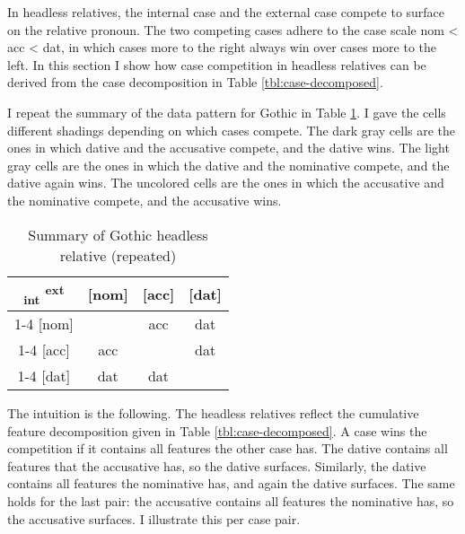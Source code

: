 In headless relatives, the internal case and the external case compete to surface on the relative pronoun. The two competing cases adhere to the case scale \ac{nom} < \ac{acc} < \ac{dat}, in which cases more to the right always win over cases more to the left. In this section I show how case competition in headless relatives can be derived from the case decomposition in Table \ref{tbl:case-decomposed}.

I repeat the summary of the data pattern for Gothic in Table \ref{tbl:summary-gothic-deriving}. I gave the cells different shadings depending on which cases compete. The dark gray cells are the ones in which dative and the accusative compete, and the dative wins. The light gray cells are the ones in which the dative and the nominative compete, and the dative again wins. The uncolored cells are the ones in which the accusative and the nominative compete, and the accusative wins.

\begin{table}[ht]
  \center
  \caption {Summary of Gothic headless relative (repeated)}
  \begin{tabular}{c|c|c|c}
    \toprule
        \textsubscript{\ac{int}} \textsuperscript{\ac{ext}}
          & [\ac{nom}]
          & [\ac{acc}]
          & [\ac{dat}]
          \\ \cmidrule{1-4}
      [\ac{nom}]
          &
          & \ac{acc}
          & \cellcolor{LG}\ac{dat}
          \\ \cmidrule{1-4}
      [\ac{acc}]
          & \ac{acc}
          &
          & \cellcolor{DG}\ac{dat}
          \\ \cmidrule{1-4}
      [\ac{dat}]
          & \cellcolor{LG}\ac{dat}
          & \cellcolor{DG}\ac{dat}
          &
          \\
    \bottomrule
  \end{tabular}
    \label{tbl:summary-gothic-deriving}
\end{table}

The intuition is the following. The headless relatives reflect the cumulative feature decomposition given in Table \ref{tbl:case-decomposed}. A case wins the competition if it contains all features the other case has. The dative contains all features that the accusative has, so the dative surfaces. Similarly, the dative contains all features the nominative has, and again the dative surfaces. The same holds for the last pair: the accusative contains all features the nominative has, so the accusative surfaces. I illustrate this per case pair.

